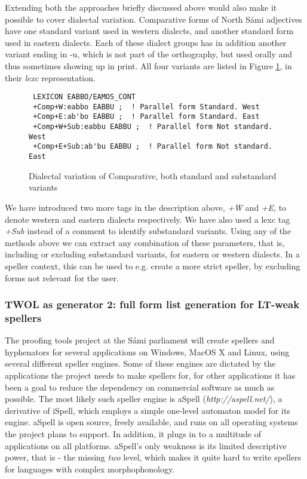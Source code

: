 \documentclass[a4paper,english]{article}
\begin{document}
Extending both the approaches briefly discussed above would also make it possible to cover dialectal variation. Comparative forms of North Sámi adjectives have one standard variant used in western dialects, and another standard form used in eastern dialects. Each of these dialect groups has in addition another variant ending in -u, which is not part of the orthography, but used orally and thus sometimes showing up in print. All four variants are listed in Figure \ref{dialect}, in their \textit{lexc} representation.

\begin{figure}[htbp]
\begin{center}
\begin{verbatim}
 LEXICON EABBO/EAMOS_CONT
 +Comp+W:eabbo EABBU ;  ! Parallel form Standard. West
 +Comp+E:ab'bo EABBU ;  ! Parallel form Standard. East
 +Comp+W+Sub:eabbu EABBU ;  ! Parallel form Not standard. West
 +Comp+E+Sub:ab'bu EABBU ;  ! Parallel form Not standard. East
\end{verbatim}
\caption{Dialectal variation of Comparative, both standard and substandard variants}
\label{dialect}
\end{center}
\end{figure}

We have introduced two more tags in the description above, \textit{+W} and \textit{+E}, to denote western and eastern dialects respectively. We have also used a lexc tag \textit{+Sub} instead of a comment to identify substandard variants. Using any of the methods above we can extract any combination of these parameters, that is, including or excluding substandard variants, for eastern or western dialects. In a speller context, this can be used to e.g. create a more strict speller, by excluding forms not relevant for the user.

\subsubsection{TWOL as generator 2: full form list generation for LT-weak spellers}\label{aspell}

The proofing tools project at the Sámi parliament will create spellers and hyphenators for several applications on Windows, MacOS X and Linux, using several different speller engines. Some of these engines are dictated by the applications the project needs to make spellers for, for other applications it has been a goal to reduce the dependency on commercial software as much as possible. The most likely such speller engine is aSpell (\textit{http://aspell.net/}), a derivative of iSpell, which employs a simple one-level automaton model for its engine. aSpell is open source, freely available, and runs on all operating systems the project plans to support. In addition, it plugs in to a multitude of applications on all platforms. aSpell's only weakness is its limited descriptive power, that is - the missing \textit{two} level, which makes it quite hard to write spellers for languages with complex morphophonology.
\end{document}

